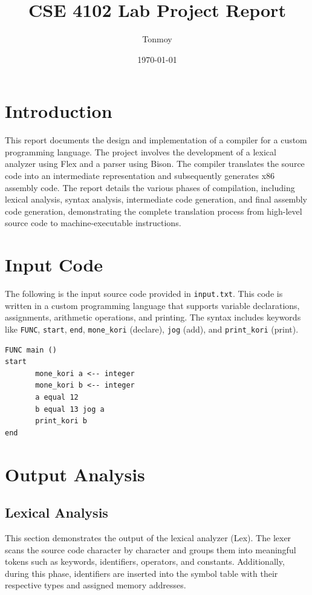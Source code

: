 \documentclass{article}
\title{CSE 4102 Lab Project Report}
\author{Tonmoy}
\date{\today}
\begin{document}


\maketitle

\section{Introduction}
This report documents the design and implementation of a compiler for a custom programming language. The project involves the development of a lexical analyzer using Flex and a parser using Bison. The compiler translates the source code into an intermediate representation and subsequently generates x86 assembly code. The report details the various phases of compilation, including lexical analysis, syntax analysis, intermediate code generation, and final assembly code generation, demonstrating the complete translation process from high-level source code to machine-executable instructions.

\section{Input Code}
The following is the input source code provided in \texttt{input.txt}. This code is written in a custom programming language that supports variable declarations, assignments, arithmetic operations, and printing. The syntax includes keywords like \texttt{FUNC}, \texttt{start}, \texttt{end}, \texttt{mone\_kori} (declare), \texttt{jog} (add), and \texttt{print\_kori} (print).

\begin{lstlisting}[frame=single]
FUNC main () 
start
       mone_kori a <-- integer
       mone_kori b <-- integer
       a equal 12
       b equal 13 jog a
       print_kori b
end
\end{lstlisting}

\section{Output Analysis}

\subsection{Lexical Analysis}
This section demonstrates the output of the lexical analyzer (Lex). The lexer scans the source code character by character and groups them into meaningful tokens such as keywords, identifiers, operators, and constants. Additionally, during this phase, identifiers are inserted into the symbol table with their respective types and assigned memory addresses.
\end{document}
